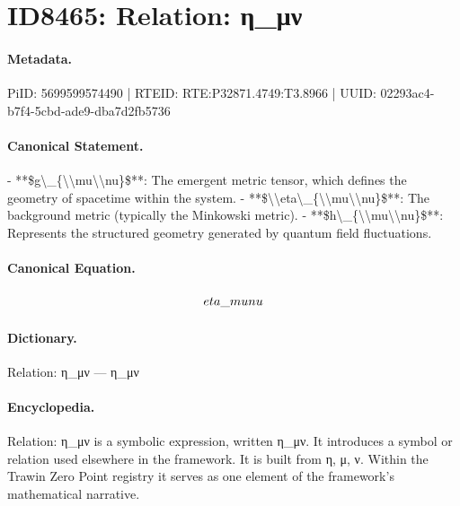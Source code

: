 \section*{ID8465: Relation: η\_μν}
\paragraph{Metadata.}
PiID: 5699599574490 | RTEID: RTE:P32871.4749:T3.8966 | UUID: 02293ac4-b7f4-5cbd-ade9-dba7d2fb5736

\paragraph{Canonical Statement.}
- **\$g\textbackslash{}\_\{\textbackslash{}\textbackslash{}mu\textbackslash{}\textbackslash{}nu\}\$**: The emergent metric tensor, which defines the geometry of spacetime within the system. - **\$\textbackslash{}\textbackslash{}eta\textbackslash{}\_\{\textbackslash{}\textbackslash{}mu\textbackslash{}\textbackslash{}nu\}\$**: The background metric (typically the Minkowski metric). - **\$h\textbackslash{}\_\{\textbackslash{}\textbackslash{}mu\textbackslash{}\textbackslash{}nu\}\$**: Represents the structured geometry generated by quantum field fluctuations.

\paragraph{Canonical Equation.}
\[
\\eta\_{\\mu\\nu}
\]

\paragraph{Dictionary.}
Relation: η\_μν — η\_μν

\paragraph{Encyclopedia.}
Relation: η\_μν is a symbolic expression, written η\_μν. It introduces a symbol or relation used elsewhere in the framework. It is built from η, μ, ν. Within the Trawin Zero Point registry it serves as one element of the framework's mathematical narrative.
